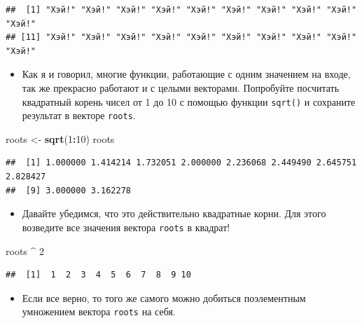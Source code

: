 \documentclass[]{book}
\newenvironment{Shaded}{\begin{snugshade}}{\end{snugshade}}
\newcommand{\KeywordTok}[1]{\textcolor[rgb]{0.13,0.29,0.53}{\textbf{#1}}}
\newcommand{\DecValTok}[1]{\textcolor[rgb]{0.00,0.00,0.81}{#1}}
\newcommand{\StringTok}[1]{\textcolor[rgb]{0.31,0.60,0.02}{#1}}
\newcommand{\OperatorTok}[1]{\textcolor[rgb]{0.81,0.36,0.00}{\textbf{#1}}}
\newcommand{\NormalTok}[1]{#1}
\providecommand{\tightlist}{%
  \setlength{\itemsep}{0pt}\setlength{\parskip}{0pt}}
\begin{document}
\begin{verbatim}
##  [1] "Хэй!" "Хэй!" "Хэй!" "Хэй!" "Хэй!" "Хэй!" "Хэй!" "Хэй!" "Хэй!" "Хэй!"
## [11] "Хэй!" "Хэй!" "Хэй!" "Хэй!" "Хэй!" "Хэй!" "Хэй!" "Хэй!" "Хэй!" "Хэй!"
\end{verbatim}

\begin{itemize}
\tightlist
\item
  Как я и говорил, многие функции, работающие с одним значением на
  входе, так же прекрасно работают и с целыми векторами. Попробуйте
  посчитать квадратный корень чисел от 1 до 10 с помощью функции
  \texttt{sqrt()} и сохраните результат в векторе \texttt{roots}.
\end{itemize}

\begin{Shaded}
\begin{Highlighting}[]
\NormalTok{roots <-}\StringTok{ }\KeywordTok{sqrt}\NormalTok{(}\DecValTok{1}\OperatorTok{:}\DecValTok{10}\NormalTok{)}
\NormalTok{roots}
\end{Highlighting}
\end{Shaded}

\begin{verbatim}
##  [1] 1.000000 1.414214 1.732051 2.000000 2.236068 2.449490 2.645751 2.828427
##  [9] 3.000000 3.162278
\end{verbatim}

\begin{itemize}
\tightlist
\item
  Давайте убедимся, что это действительно квадратные корни. Для этого
  возведите все значения вектора \texttt{roots} в квадрат!
\end{itemize}

\begin{Shaded}
\begin{Highlighting}[]
\NormalTok{roots }\OperatorTok{^}\StringTok{ }\DecValTok{2}
\end{Highlighting}
\end{Shaded}

\begin{verbatim}
##  [1]  1  2  3  4  5  6  7  8  9 10
\end{verbatim}

\begin{itemize}
\tightlist
\item
  Если все верно, то того же самого можно добиться поэлементным
  умножением вектора \texttt{roots} на себя.
\end{itemize}
\end{document}
